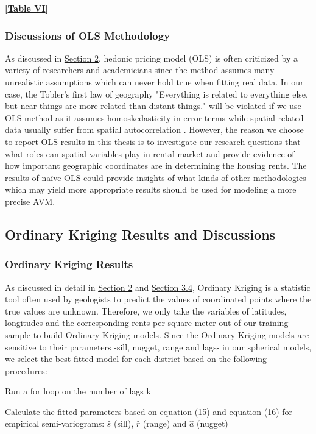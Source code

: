 \documentclass[a4paper, 12pt]{article} %
\newcommand*\circled[1]{\tikz[baseline=(char.base)]{
            \node[shape=circle,draw,inner sep=2pt] (char) {#1};}}
\begin{document}
\bigskip
 \centerline{\bf [\hyperref[tb6]{Table VI}]}
\bigskip

\subsubsection{Discussions of OLS Methodology}
As discussed in \hyperref[sec2]{Section 2}, hedonic pricing model (OLS) is often criticized by a variety of researchers and academicians since the method assumes many unrealistic assumptions which can never hold true when fitting real data. In our case, the Tobler’s first law of geography "Everything is related to everything else, but near things are more related than distant things." \citep{tobler1970computer} will be violated if we use OLS method as it assumes homoskedasticity in error terms while spatial-related data usually suffer from spatial autocorrelation \citep{anselin1990some, basile2014modeling}. However, the reason we choose to report OLS results in this thesis is to investigate our research questions that what roles can spatial variables play in rental market and provide evidence of how important geographic coordinates are in determining the housing rents. The results of naïve OLS could provide insights of what kinds of other methodologies which may yield more appropriate results should be used for modeling a more precise AVM.

\subsection{Ordinary Kriging Results and Discussions} 
\subsubsection{Ordinary Kriging Results}
As discussed in detail in \hyperref[sec2]{Section 2} and \hyperref[sec34]{Section 3.4}, Ordinary Kriging is a statistic tool often used by geologists to predict the values of coordinated points where the true values are unknown. Therefore, we only take the variables of latitudes, longitudes and the corresponding rents per square meter out of our training sample to build Ordinary Kriging models. Since the Ordinary Kriging models are sensitive to their parameters -sill, nugget, range and lags- in our spherical models, we select the best-fitted model for each district based on the following procedures: 

\noindent \circled{1} Run a for loop on the number of lags k

\noindent \circled{2} Calculate the fitted parameters based on \hyperref[eq15]{equation (15)} and \hyperref[eq16]{equation (16)} for empirical semi-variograms:  $\widehat{s}$ (sill),  
$\widehat{r}$ (range) and $\widehat{a}$ (nugget)
\end{document}
